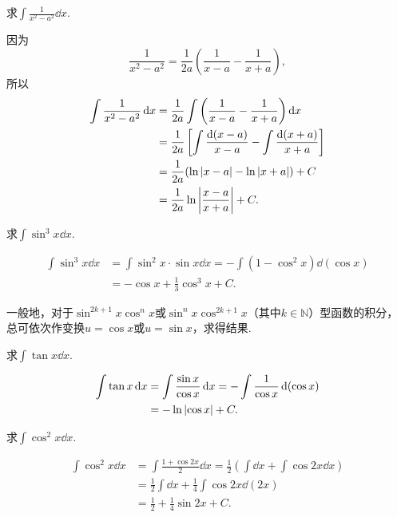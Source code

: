 \begin{example}
求\(\int \frac{1}{x^2 - a^2} \dd{x}\).
\begin{solution}
因为\[
\frac{1}{x^2 - a^2} = \frac{1}{2a} \left(\frac{1}{x-a} - \frac{1}{x+a}\right),
\]所以\begin{align*}
\int \frac{1}{x^2 - a^2} \dd{x}
&= \frac{1}{2a} \int \left(\frac{1}{x-a} - \frac{1}{x+a}\right) \dd{x} \\
&= \frac{1}{2a} \left[ \int \frac{\dd(x-a)}{x-a} - \int \frac{\dd(x+a)}{x+a} \right] \\
&= \frac{1}{2a} ( \ln\abs{x-a} - \ln\abs{x+a} ) + C \\
&= \frac{1}{2a} \ln\abs{\frac{x-a}{x+a}} + C.
\end{align*}
\end{solution}
\end{example}

\begin{example}
求\(\int \sin^3 x \dd{x}\).
\begin{solution}
\begin{align*}
\int \sin^3 x \dd{x}
&= \int \sin^2 x \cdot \sin x \dd{x}
= -\int (1 - \cos^2 x) \dd(\cos x) \\
&= -\cos x + \frac{1}{3} \cos^3 x + C.
\end{align*}
\end{solution}
\end{example}

一般地，对于\(\sin^{2k+1} x \cos^n x\)或\(\sin^n x \cos^{2k+1} x\)（其中\(k\in\mathbb{N}\)）型函数的积分，总可依次作变换\(u = \cos x\)或\(u = \sin x\)，求得结果.

\begin{example}
求\(\int \tan x \dd{x}\).
\begin{solution}
\begin{align*}
\int \tan x \dd{x}
&= \int \frac{\sin x}{\cos x} \dd{x}
= - \int \frac{1}{\cos x} \dd(\cos x) \\
&= - \ln\abs{\cos x} + C.
\end{align*}
\end{solution}
\end{example}

\begin{example}
求\(\int \cos^2 x \dd{x}\).
\begin{solution}
\begin{align*}
\int \cos^2 x \dd{x}
&= \int \frac{1 + \cos 2x}{2} \dd{x}
= \frac{1}{2} \left( \int \dd{x} + \int \cos 2x \dd{x} \right) \\
&= \frac{1}{2} \int \dd{x} + \frac{1}{4} \int \cos 2x \dd(2x) \\
&= \frac{1}{2} + \frac{1}{4} \sin 2x + C.
\end{align*}
\end{solution}
\end{example}


